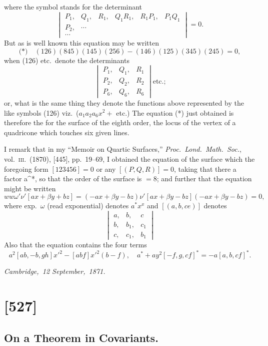 \documentclass[11pt,a4paper]{article}
\theoremstyle{plain}
\theoremstyle{definition}
\begin{document}
\noindent
where the symbol stands for the determinant
\[
\begin{vmatrix}
P_1, & Q_1, & R_1, & Q_1 R_1, & R_1 P_1, & P_1 Q_1 \\
P_2, & \cdots & \\
\cdots &
\end{vmatrix} = 0.
\]
But as is well known this equation may be written
\[
\text{(*)}\quad (126)(845)(145)(256) - (146)(125)(345)(245) = 0,
\]
when (126) etc.\ denote the determinants
\[
\begin{vmatrix}
P_1, & Q_1, & R_1 \\
P_2, & Q_2, & R_2 \\
P_6, & Q_6, & R_6
\end{vmatrix} \text{etc.;}
\]
or, what is the same thing they denote the functions above represented by the like
symbols (126) viz.\ ($a_1 a_2 a_6 x^2 + $ etc.) The equation (*) just obtained is therefore the
for the surface of the eighth order, the locus of the vertex of a quadricone which
touches six given lines.

I remark that in my ``Memoir on Quartic Surfaces,'' \textit{Proc.\ Lond.\ Math.\ Soc.}, vol.\ \textsc{iii}.\
(1870), [445], pp.\ 19--69, I obtained the equation of the surface which the foregoing
form $[123456] = 0$ or any $[(P, Q, R)] = 0$, taking that there a factor a^*, so that
the order of the surface is $= 8$; and further that the equation might be written
\[
ww \omega'\nu' [a x + \beta y + b z] = (-a x + \beta y - b z) \nu' [a x + \beta y - b z](-a x + \beta y - b z) = 0,
\]
where exp.\ $\omega$ (read exponential) denotes $a^* x^x$ and $[(a, b, ce)]$ denotes
\[
\begin{vmatrix}
a, & b, & c \\
b, & b_1, & c_1 \\
c, & c_1, & b_1
\end{vmatrix}
\]
Also that the equation contains the four terms
\[
a^2 [ab, -b, gh] x'^2 - [a b f] x'^2 (b - f), \quad a^* + a y^2 [-f, g, c f]^* = -a [a, b, c f]^*.
\]

\noindent\textit{Cambridge,\ 12 September,\ 1871.}

\clearpage

\section{[527]}
\subsection{On a Theorem in Covariants.}
\end{document}
